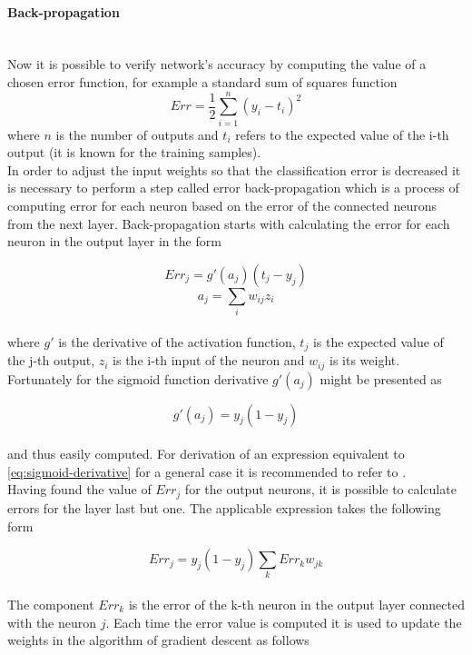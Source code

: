 \documentclass[11pt,oneside, a4paper]{report}
\begin{document}
\paragraph{Back-propagation}\mbox{}\\
Now it is possible to verify network's accuracy by computing the value of a chosen error function, for example a standard sum of squares function
\begin{equation}
Err = \frac{1}{2}\sum_{i=1}^{n}(y_i - t_i)^2
\end{equation}
where $n$ is the number of outputs and $t_i$ refers to the expected value of the i-th output (it is known for the training samples).
\\
In order to adjust the input weights so that the classification error is decreased it is necessary to perform a step called error back-propagation which is a process of computing error for each neuron based on the error of the connected neurons from the next layer. Back-propagation starts with calculating the error for each neuron in the output layer in the form

\begin{equation}
Err_j = g'(a_j) (t_j - y_j)
\end{equation}
\begin{equation}
a_j=\sum_{i} w_{ij} z_i
\end{equation}
\\
where $g'$ is the derivative of the activation function, $t_j$ is the expected value of the j-th output, $z_i$ is the i-th input of the neuron and $w_{ij}$ is its weight. Fortunately for the sigmoid function derivative $g'(a_j)$ might be presented as

\begin{equation} \label{eq:sigmoid-derivative}
g'(a_j) = y_j (1 - y_j)
\end{equation}
\\
and thus easily computed. For derivation of an expression equivalent to \ref{eq:sigmoid-derivative} for a general case it is recommended to refer to \cite{BISHOP1995}.
\\
Having found the value of $Err_j$ for the output neurons, it is possible to calculate errors for the layer last but one. The applicable expression takes the following form

\begin{equation}
Err_j = y_j(1-y_j) \sum_{k} Err_k w_{jk}
\end{equation}
\\
The component $Err_k$ is the error of the k-th neuron in the output layer connected with the neuron $j$. Each time the error value is computed it is used to update the weights in the algorithm of gradient descent as follows
\end{document}
